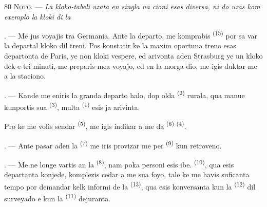 \begin{VUpage}[82]{80}
\VUsaut{4.0mm}
\VUsaut{2.4mm}
\VUsaut{3.4mm}
\VUblancAlinea
\textsc{Noto.} --- \textit{La kloko-tabeli uzata en singla na}\cc
\textit{cioni esas diversa, ni do uzas kom exemplo la}\nl
\textit{kloki di la} 

. --- Me jus voyajis tra Germania. Ante la\nl
departo, me komprabis  \textsuperscript{(15)} por sa\cc
var la departal kloko dil treni. Pos konstatir\nl
ke la maxim oportuna treno esas departonta\nl
de Paris, ye non kloki vespere, ed arivonta\nl
aden Strasburg ye un kloko dek-e-tri minuti,\nl
me preparis mea voyajo, ed en la morga dio,\nl
me igis duktar me a la staciono.

. --- Kande me eniris la granda departo\cc
halo, dop olda  \textsuperscript{(2)} rurala, qua manue\nl
kunportis sua  \textsuperscript{(3)}, multa \cc
{} \textsuperscript{(1)} esis ja arivinta.

\VUblancAlinea
Pro ke me volis sendar \cc
{} \textsuperscript{(5)}, me igis indikar a me da  \textsuperscript{(6)}\nl
{} \textsuperscript{(4)}.

. --- Ante pasar aden la  \textsuperscript{(7)} me\nl
iris provizar me per  \textsuperscript{(9)} kun retroveno.

. --- Me ne longe vartis an la  \textsuperscript{(8)},\nl
nam poka personi esis ibe.  \textsuperscript{(10)}, qua\nl
esis departanta konjede, komplezis cedar a me\nl
sua foyo, tale ke me havis suficanta tempo por\nl
demandar kelk informi de la  \textsuperscript{(13)},\nl
qua esis konversanta kun la  \textsuperscript{(12)} dil\nl
surveyado e kun la  \textsuperscript{(11)} dejuranta.
\end{VUpage}

